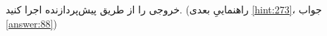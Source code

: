 \section{}
\paragraph{}\label{hint:90}
خروجی را از طریق پیش‌پردازنده اجرا کنید. (راهنماییِ بعدی \ref{hint:273}، جواب \ref{answer:88})